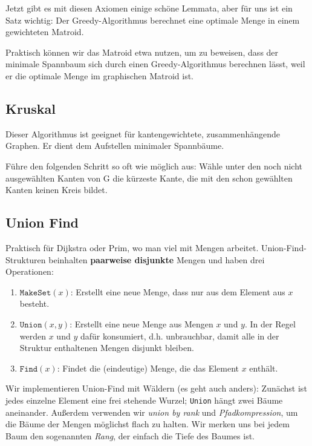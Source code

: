 \documentclass[11pt]{scrartcl}
\begin{document}
Jetzt gibt es mit diesen Axiomen einige schöne Lemmata, aber für uns ist ein Satz wichtig: Der Greedy-Algorithmus berechnet eine optimale Menge in einem gewichteten Matroid.

Praktisch können wir das Matroid etwa nutzen, um zu beweisen, dass der minimale Spannbaum sich durch einen Greedy-Algorithmus berechnen lässt, weil er die optimale Menge im graphischen Matroid ist.

\subsection{Kruskal}
Dieser Algorithmus ist geeignet für kantengewichtete, zusammenhängende Graphen. Er dient dem Aufstellen minimaler Spannbäume.

Führe den folgenden Schritt so oft wie möglich aus: Wähle unter den noch nicht ausgewählten Kanten von G die kürzeste Kante, die mit den schon gewählten Kanten keinen Kreis bildet.

\subsection{Union Find}

Praktisch für Dijkstra oder Prim, wo man viel mit Mengen arbeitet.
Union-Find-Strukturen beinhalten \textbf{paarweise disjunkte} Mengen und haben drei Operationen:

\begin{enumerate}
\item $\texttt{MakeSet}(x)$: Erstellt eine neue Menge, dass nur aus dem Element aus $x$ besteht.
\item $\texttt{Union}(x,y)$: Erstellt eine neue Menge aus Mengen $x$ und $y$. In der Regel werden $x$ und $y$ dafür konsumiert, d.h. unbrauchbar, damit alle in der Struktur enthaltenen Mengen disjunkt bleiben.
\item $\texttt{Find}(x)$: Findet die (eindeutige) Menge, die das Element $x$ enthält.
\end{enumerate}

Wir implementieren Union-Find mit Wäldern (es geht auch anders): Zunächst ist jedes einzelne Element eine frei stehende Wurzel; \texttt{Union} hängt zwei Bäume aneinander. Außerdem verwenden wir \textit{union by rank} und \textit{Pfadkompression}, um die Bäume der Mengen möglichst flach zu halten. Wir merken uns bei jedem Baum den sogenannten \textit{Rang}, der einfach die Tiefe des Baumes ist.
\end{document}
